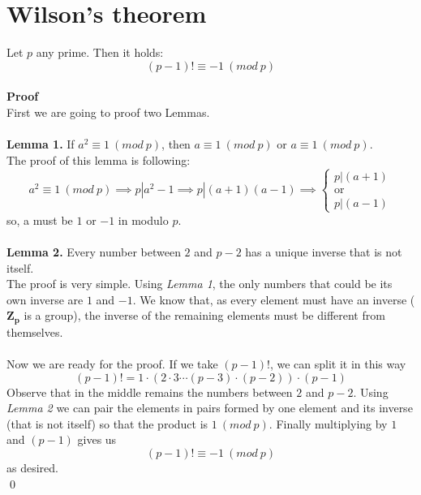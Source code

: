 \documentclass[12pt]{article}
\begin{document}
\section{Wilson's theorem}
Let $p$ any prime. Then it holds:
\[(p-1)!\equiv -1 \ (mod \ p)\]
\\
\textbf{Proof} \\
First we are going to proof two Lemmas.\\ \\
\textbf{Lemma 1.} If $a^2\equiv 1 \ (mod \ p)$, then $a \equiv 1 \ (mod \ p)$ or $a \equiv 1 \ (mod \ p)$. \\
The proof of this lemma is following:
\[a^2\equiv 1 \ (mod \ p) \implies p|a^2-1 \implies p|(a+1)(a-1) \implies \begin{cases}
p|(a+1) \\
\text{or} \\
p|(a-1) 
\end{cases}\]
so, a must be $1$ or $-1$ in modulo $p$. \\
\\
\textbf{Lemma 2.} Every number between $2$ and $p-2$ has a unique inverse that is not itself.\\
The proof is very simple. Using \textit{Lemma 1}, the only numbers that could be its own inverse are $1$ and $-1$. We know that, as every element must have an inverse ($\mathbf{Z_p}$ is a group), the inverse of the remaining elements must be different from themselves.\\
\\
Now we are ready for the proof. If we take $(p-1)!$, we can split it in this way
\[(p-1)!=1\cdot (2\cdot 3 \cdots (p-3) \cdot (p-2))\cdot (p-1)\]
Observe that in the middle remains the numbers between $2$ and $p-2$. Using \textit{Lemma 2} we can pair the elements in pairs formed by one element and its inverse (that is not itself) so that the product is $1 \ (mod \ p)$. Finally multiplying by $1$ and $(p-1)$ gives us \[(p-1)!\equiv -1 \ (mod \ p)\] as desired. \\
\qed
\end{document}
